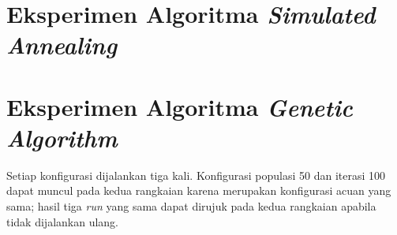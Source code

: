 \section{Eksperimen Algoritma \textit{Simulated Annealing}}

\section{Eksperimen Algoritma \textit{Genetic Algorithm}}

Setiap konfigurasi dijalankan tiga kali. Konfigurasi populasi 50 dan iterasi 100 dapat muncul pada kedua rangkaian karena merupakan konfigurasi acuan yang sama; hasil tiga \textit{run} yang sama dapat dirujuk pada kedua rangkaian apabila tidak dijalankan ulang.

